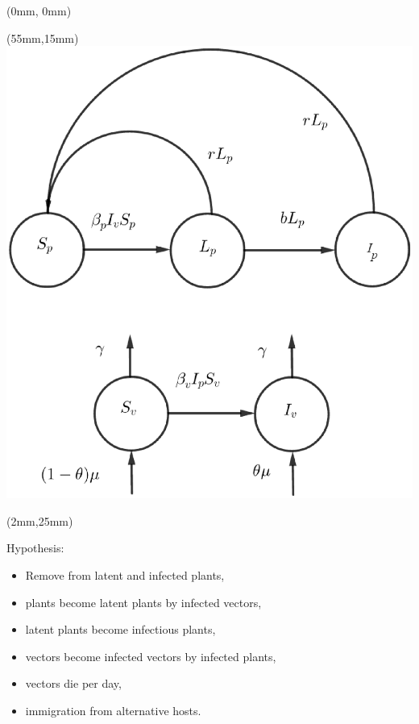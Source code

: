 \begin{frame}{}
    \begin{textblock*}{60mm}(0mm, 0mm)
        \begin{bibunit}
            \nocite{Holt1999}
            \putbib
        \end{bibunit}
    \end{textblock*}
%
    \begin{textblock*}{70mm}(55mm,15mm)
        \includegraphics[width=\linewidth]{assets/deterministic_model_diagram.eps}
    \end{textblock*}
    \begin{textblock*}{50mm}(2mm,25mm)
        \begin{graybox}{Hypothesis:}
            \begin{itemize}[<+->]
                \item Remove from latent and infected plants,
                \item plants become latent plants by infected vectors,
                \item latent plants become infectious plants,
                \item vectors become infected vectors by infected plants,
                \item vectors die per day,
                \item immigration from alternative hosts.
            \end{itemize}
        \end{graybox}
    \end{textblock*}
\end{frame}
